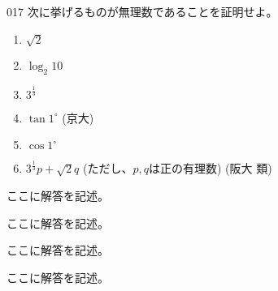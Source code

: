 \begin{thm}{017}{}{}
 次に挙げるものが無理数であることを証明せよ。
 \begin{enumerate}
  \item $\sqrt{2}$ 
  \item $\log_2 10$  
  \item $3^{\frac{1}{3}}$ 
  \item $\tan 1^\circ$  (京大)
  \item $\cos 1^\circ$ 
  \item $3^{\frac{1}{3}}p+\sqrt{2}q$ (ただし、$p, q$は正の有理数)  (阪大 類)
 \end{enumerate}
\end{thm}

ここに解答を記述。

ここに解答を記述。

ここに解答を記述。

ここに解答を記述。